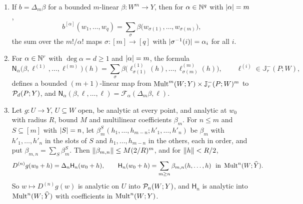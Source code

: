 \begin{lemma}\label{dp:13:lem:lifts}
\leavevmode
\begin{enumerate}
\item If $b=\Delta_m\beta$ for a bounded $m$-linear $\beta\colon W^m\to Y$, then for $\alpha\in\mathbb N^q$ with $\lvert \alpha\rvert=m$,
\begin{equation}\label{dp:13:eq:lift-coeff}
 b^{[\alpha]}(w_1,\dots,w_q)=\sum_\sigma\beta\bigl(w_{\sigma(1)},\dots,w_{\sigma(m)}\bigr),
\end{equation}
the sum over the $m!/\alpha!$ maps $\sigma\colon[m]\to[q]$ with $\lvert \sigma^{-1}(i)\rvert=\alpha_i$ for all $i$.
\item For $\alpha\in\mathbb N^r$ with $\deg\alpha=d\ge1$ and $\lvert \alpha\rvert=m$, the formula
\[
 \mathsf N_\alpha\bigl(\beta,\ell^{(1)},\dots,\ell^{(m)}\bigr)(h)=\sum_\sigma\beta\bigl(\ell^{(1)}_{\sigma(1)}(h),\dots,\ell^{(m)}_{\sigma(m)}(h)\bigr),\qquad\ell^{(i)}\in\mathbb J^-_r(P;W),
\]
defines a bounded $(m+1)$-linear map from $\operatorname{Mult}^m(W;Y)\times\mathbb J^-_r(P;W)^m$ to $\mathcal P_d(P;Y)$, and $\mathsf N_\alpha(\beta,\ell,\dots,\ell)=\mathcal F_\alpha(\Delta_m\beta,\ell)$.
\item Let $g\colon U\to Y$, $U\subseteq W$ open, be analytic at every point, and analytic at $w_0$ with radius $R$, bound $M$ and multilinear coefficients $\beta_m$. For $n\le m$ and $S\subseteq[m]$ with $\lvert S\rvert=n$, let $\beta_m^S(h_1,\dots,h_{m-n};h'_1,\dots,h'_n)$ be $\beta_m$ with $h'_1,\dots,h'_n$ in the slots of $S$ and $h_1,\dots,h_{m-n}$ in the others, each in order, and put $\beta_{m,n}=\sum_S\beta_m^S$. Then $\lVert \beta_{m,n}\rVert\le M(2/R)^m$, and for $\lVert h\rVert<R/2$,
\begin{equation}\label{dp:13:eq:hasse-analytic}
 D^{(n)}g(w_0+h)=\Delta_n\mathsf H_n(w_0+h),\qquad\mathsf H_n(w_0+h)=\sum_{m\ge n}\beta_{m,n}(h,\dots,h)\ \text{ in }\operatorname{Mult}^n(W;\widehat Y).
\end{equation}
So $w\mapsto D^{(n)}g(w)$ is analytic on $U$ into $\mathcal P_n(W;Y)$, and $\mathsf H_n$ is analytic into $\operatorname{Mult}^n(W;\widehat Y)$ with coefficients in $\operatorname{Mult}^n(W;Y)$.
\end{enumerate}
\end{lemma}

